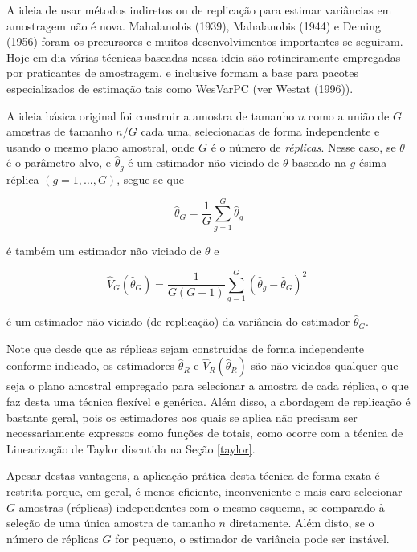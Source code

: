 \documentclass[
  12pt,
  brazilian,
]{book}
\theoremstyle{definition}
\theoremstyle{definition}
\theoremstyle{definition}
\theoremstyle{definition}
\theoremstyle{remark}
\begin{document}
A ideia de usar métodos indiretos ou de replicação para estimar variâncias em amostragem não é nova. Mahalanobis (1939), Mahalanobis (1944) e Deming (1956) foram os precursores e muitos desenvolvimentos importantes se seguiram. Hoje em dia várias técnicas baseadas nessa ideia são rotineiramente empregadas por praticantes de amostragem, e
inclusive formam a base para pacotes especializados de estimação tais como WesVarPC (ver Westat (1996)).

A ideia básica original foi construir a amostra de tamanho \(n\) como a união de \(G\) amostras de tamanho \(n/G\) cada uma, selecionadas de forma independente e usando o mesmo plano amostral, onde \(G\) é o número de \emph{réplicas}. Nesse caso, se \(\theta\) é o parâmetro-alvo, e \(\widehat{\theta}_{g}\) é um estimador não viciado de \(\theta\) baseado na \(g\)-ésima réplica \((g=1,\ldots ,G)\), segue-se que

\[
\widehat{\theta }_{G}=\frac{1}{G}\sum_{g=1}^{G}\widehat{\theta }_{g} 
\]

é também um estimador não viciado de \(\theta\) e

\begin{equation}
\widehat{V}_{G} \left( \widehat{\theta }_{G}\right) = \frac{1}{G \left(
G-1 \right)} \sum_{g=1}^{G} \left( \widehat{\theta }_{g} - \widehat{\theta}_{G} \right)^{2}  \,\, \label{eq:estpa25}
\end{equation}

é um estimador não viciado (de replicação) da variância do estimador \(\widehat{\theta}_{G}\).

Note que desde que as réplicas sejam construídas de forma independente conforme indicado, os estimadores \(\widehat{\theta }_{R}\) e \(\widehat{V}_{R}\left( \widehat{\theta }_{R}\right)\) são não viciados qualquer que seja o plano amostral empregado para selecionar a amostra de cada réplica, o que faz desta uma técnica
flexível e genérica. Além disso, a abordagem de replicação é bastante geral, pois os estimadores aos quais se aplica não precisam ser necessariamente expressos como funções de totais, como ocorre com a técnica de Linearização de Taylor discutida na Seção \ref{taylor}.

Apesar destas vantagens, a aplicação prática desta técnica de forma exata é restrita porque, em geral, é menos eficiente, inconveniente e mais caro selecionar \(G\) amostras (réplicas) independentes com o mesmo esquema, se comparado à seleção de uma única amostra de tamanho \(n\) diretamente. Além disto, se o número de
réplicas \(G\) for pequeno, o estimador de variância pode ser instável.
\end{document}
